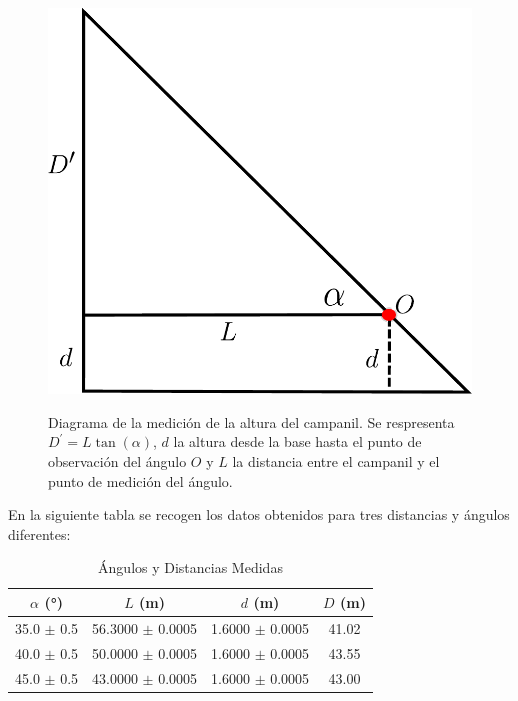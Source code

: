 \documentclass[10pt,a4paper]{article}
\begin{document}
\begin{multicols}{2}
		
		\begin{figure}[H]
			\centering
			\includegraphics[scale=0.4]{IMG/camp.pdf} 
			\label{grafico campanil}
			\caption{Diagrama de la medición de la altura del campanil. Se respresenta $D^{\prime} = L \tan(\alpha)$,  $d$ la altura desde la base hasta el punto de observación del ángulo $O$ y $L$ la distancia entre el campanil y el punto de medición del ángulo.}
		\end{figure}
		
	En la siguiente tabla se recogen los datos obtenidos para tres distancias y ángulos diferentes:
	\begin{table}[H]
\centering
\begin{tabular}{|c|c|c|c|}
\hline
\textbf{$\alpha$ (°)} & $L$ (m) & $d$ (m)&  $D$ (m) \\ \hline
35.0 $\pm$ 0.5  & 56.3000 $\pm$ 0.0005 &  1.6000 $\pm$ 0.0005 & 41.02 \\ 
40.0 $\pm$ 0.5 & 50.0000 $\pm$ 0.0005 & 1.6000 $\pm$ 0.0005 & 43.55 \\ 
45.0 $\pm$ 0.5 & 43.0000 $\pm$ 0.0005 & 1.6000 $\pm$ 0.0005 &  43.00 \\ \hline
\end{tabular}
\caption{Ángulos y Distancias Medidas}
\label{tab:angulos_distancias}
\end{table}
		
	\end{multicols}
	
	
	
\end{document}
